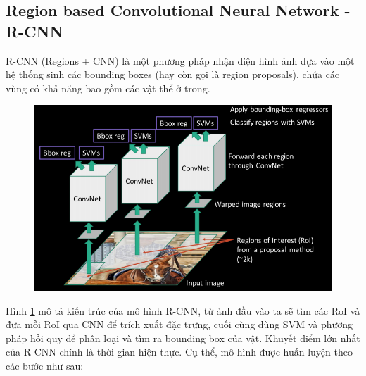 \subsection{Region based Convolutional Neural Network - R-CNN}
R-CNN (Regions + CNN) là một phương pháp nhận diện hình ảnh dựa vào một hệ thống sinh các bounding boxes (hay còn gọi là region proposals), chứa các vùng có khả năng bao gồm các vật thể ở trong.

\begin{center}
    \begin{figure}[H]
    \centering
    \includegraphics[width=0.6\columnwidth]{images/chap2/RCNNSimple.png}
    \label{fig:2.27}
    \end{figure}
\end{center}
Hình \ref{fig:2.27} mô tả kiến trúc của mô hình R-CNN, từ ảnh đầu vào ta sẽ tìm các RoI và đưa mỗi RoI qua CNN để trích xuất đặc trưng, cuối cùng dùng SVM và phương pháp hồi quy để phân loại và tìm ra bounding box của vật.
Khuyết điểm lớn nhất của R-CNN chính là thời gian hiện thực. Cụ thể, mô hình được huấn luyện theo các bước như sau:

